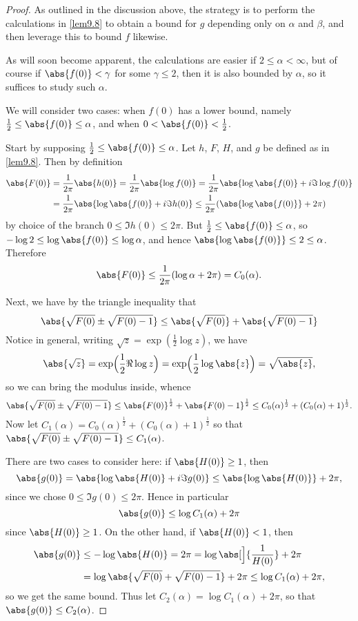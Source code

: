 \begin{proof}
	As outlined in the discussion above, the strategy is to perform the calculations in \autoref{lem9.8} to obtain a bound for $g$ depending only on $\alpha$ and $\beta$, and then leverage this to bound $f$ likewise.

	As will soon become apparent, the calculations are easier if $2 \leq \alpha < \infty$, but of course if $\abs{f(0)} < \gamma$ for some $\gamma \leq 2$, then it is also bounded by $\alpha$, so it suffices to study such $\alpha$.

	We will consider two cases: when $f(0)$ has a lower bound, namely $\frac{1}{2} \leq \abs{f(0)} \leq \alpha$, and when $0 < \abs{f(0)} < \frac{1}{2}$.

	Start by supposing $\frac{1}{2} \leq \abs{f(0)} \leq \alpha$.
	Let $h$, $F$, $H$, and $g$ be defined as in \autoref{lem9.8}.
	Then by definition
	\begin{align*}
		\abs{F(0)} &= \frac{1}{2\pi} \abs{h(0)} = \frac{1}{2 \pi} \abs{\log f(0)} = \frac{1}{2\pi} \abs{ \log \abs{f(0)} + i \Im \log f(0) } \\
		&= \frac{1}{2 \pi} \abs{ \log \abs{f(0)} + i \Im h(0) } \leq \frac{1}{2 \pi} ( \abs{\log\abs{f(0)}} + 2 \pi)
	\end{align*}
	by choice of the branch $0 \leq \Im h(0) \leq 2 \pi$.
	But $\frac{1}{2} \leq \abs{f(0)} \leq \alpha$, so $- \log 2 \leq \log \abs{f(0)} \leq \log \alpha$, and hence $\abs{\log\abs{f(0)}} \leq 2 \leq \alpha$.
	Therefore
	\[
		\abs{F(0)} \leq \frac{1}{2 \pi} ( \log \alpha + 2 \pi ) = C_0(\alpha).
	\]

	Next, we have by the triangle inequality that
	\[
		\abs{\sqrt{F(0)} \pm \sqrt{F(0) - 1}} \leq \abs{\sqrt{F(0)}} + \abs{\sqrt{F(0) - 1}}
	\]
	Notice in general, writing $\sqrt{z} = \exp(\frac{1}{2} \log z)$, we have
	\[
		\abs{\sqrt{z}} = \exp\Bigl( \frac{1}{2} \Re \log z \Bigr) = \exp\Bigl( \frac{1}{2} \log\abs{z} \Bigr) = \sqrt{\abs{z}},
	\]
	so we can bring the modulus inside, whence
	\[
		\abs{\sqrt{F(0)} \pm \sqrt{F(0) - 1}} \leq \abs{F(0)}^{\frac{1}{2}} + \abs{F(0) - 1}^{\frac{1}{2}} \leq C_0(\alpha)^{\frac{1}{2}} + (C_0(\alpha) + 1)^{\frac{1}{2}}.
	\]
	Now let $C_1(\alpha) = C_0(\alpha)^{\frac{1}{2}} + (C_0(\alpha) + 1)^{\frac{1}{2}}$ so that $\abs{\sqrt{F(0)} \pm \sqrt{F(0) - 1}} \leq C_1(\alpha)$.

	There are two cases to consider here: if $\abs{H(0)} \geq 1$, then
	\[
		\abs{g(0)} = \abs{\log \abs{H(0)} + i \Im g(0)} \leq \abs{\log\abs{H(0)}} + 2 \pi,
	\]
	since we chose $0 \leq \Im g(0) \leq 2 \pi$.
	Hence in particular
	\[
		\abs{g(0)} \leq \log C_1(\alpha) + 2\pi
	\]
	since $\abs{H(0)} \geq 1$.
	On the other hand, if $\abs{H(0)} < 1$, then
	\begin{align*}
		\abs{g(0)} &\leq - \log \abs{H(0)} = 2\pi = \log\abs[\Big]{\frac{1}{H(0)}} + 2\pi \\
		&= \log\abs{\sqrt{F(0)} + \sqrt{F(0) - 1}} + 2\pi \leq \log C_1(\alpha) + 2\pi,
	\end{align*}
	so we get the same bound.
	Thus let $C_2(\alpha) = \log C_1(\alpha) + 2\pi$, so that $\abs{g(0)} \leq C_2(\alpha)$.


\end{proof}
